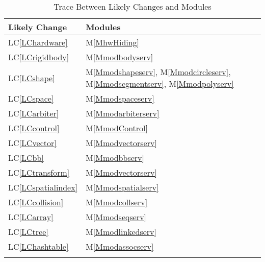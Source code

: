 \documentclass[12pt]{article}
\begin{document}
\begin{longtable}{l l}
\toprule
Likely Change & Modules
\\
\midrule
LC\ref{LChardware} & M\ref{MhwHiding}
\\
LC\ref{LCrigidbody} & M\ref{Mmodbodyserv}
\\
LC\ref{LCshape} & M\ref{Mmodshapeserv}, M\ref{Mmodcircleserv}, M\ref{Mmodsegmentserv}, M\ref{Mmodpolyserv}
\\
LC\ref{LCspace} & M\ref{Mmodspaceserv}
\\
LC\ref{LCarbiter} & M\ref{Mmodarbiterserv}
\\
LC\ref{LCcontrol} & M\ref{MmodControl}
\\
LC\ref{LCvector} & M\ref{Mmodvectorserv}
\\
LC\ref{LCbb} & M\ref{Mmodbbserv}
\\
LC\ref{LCtransform} & M\ref{Mmodvectorserv}
\\
LC\ref{LCspatialindex} & M\ref{Mmodspatialserv}
\\
LC\ref{LCcollision} & M\ref{Mmodcollserv}
\\
LC\ref{LCarray} & M\ref{Mmodseqserv}
\\
LC\ref{LCtree} & M\ref{Mmodlinkedserv}
\\
LC\ref{LChashtable} & M\ref{Mmodassocserv}
\\
\bottomrule
\caption{Trace Between Likely Changes and Modules}
\label{Table:TBLCaM}
\end{longtable}
\end{document}
